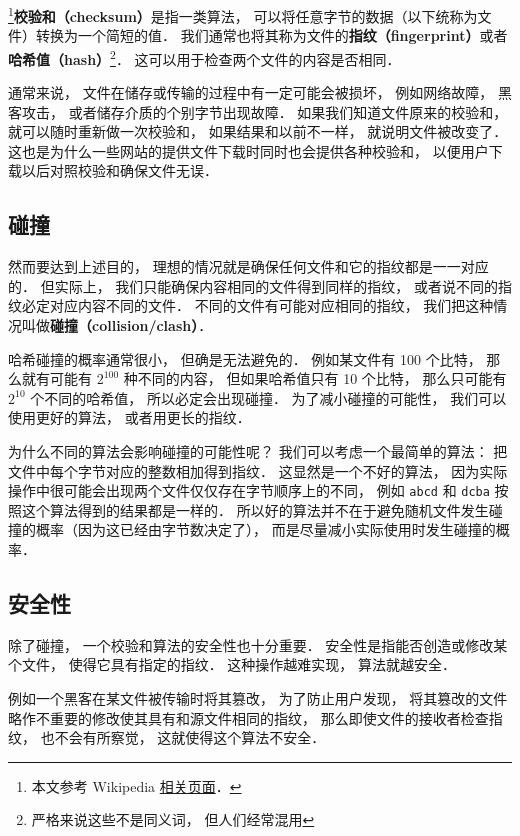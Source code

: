 

\footnote{本文参考 Wikipedia \href{https://en.wikipedia.org/wiki/Checksum}{相关页面}．}\textbf{校验和（checksum）}是指一类算法， 可以将任意字节的数据（以下统称为文件）转换为一个简短的值． 我们通常也将其称为文件的\textbf{指纹（fingerprint）}或者\textbf{哈希值（hash）}\footnote{严格来说这些不是同义词， 但人们经常混用}． 这可以用于检查两个文件的内容是否相同． %

通常来说， 文件在储存或传输的过程中有一定可能会被损坏， 例如网络故障， 黑客攻击， 或者储存介质的个别字节出现故障． 如果我们知道文件原来的校验和， 就可以随时重新做一次校验和， 如果结果和以前不一样， 就说明文件被改变了． 这也是为什么一些网站的提供文件下载时同时也会提供各种校验和， 以便用户下载以后对照校验和确保文件无误．

\subsection{碰撞}
然而要达到上述目的， 理想的情况就是确保任何文件和它的指纹都是一一对应的． 但实际上， 我们只能确保内容相同的文件得到同样的指纹， 或者说不同的指纹必定对应内容不同的文件． 不同的文件有可能对应相同的指纹， 我们把这种情况叫做\textbf{碰撞（collision/clash）}．

哈希碰撞的概率通常很小， 但确是无法避免的． 例如某文件有 100 个比特， 那么就有可能有 $2^{100}$ 种不同的内容， 但如果哈希值只有 10 个比特， 那么只可能有 $2^{10}$ 个不同的哈希值， 所以必定会出现碰撞． 为了减小碰撞的可能性， 我们可以使用更好的算法， 或者用更长的指纹．

为什么不同的算法会影响碰撞的可能性呢？ 我们可以考虑一个最简单的算法： 把文件中每个字节对应的整数相加得到指纹． 这显然是一个不好的算法， 因为实际操作中很可能会出现两个文件仅仅存在字节顺序上的不同， 例如 \verb|abcd| 和 \verb|dcba| 按照这个算法得到的结果都是一样的． 所以好的算法并不在于避免随机文件发生碰撞的概率（因为这已经由字节数决定了）， 而是尽量减小实际使用时发生碰撞的概率．

\subsection{安全性}
除了碰撞， 一个校验和算法的安全性也十分重要． 安全性是指能否创造或修改某个文件， 使得它具有指定的指纹． 这种操作越难实现， 算法就越安全．

例如一个黑客在某文件被传输时将其篡改， 为了防止用户发现， 将其篡改的文件略作不重要的修改使其具有和源文件相同的指纹， 那么即使文件的接收者检查指纹， 也不会有所察觉， 这就使得这个算法不安全．

